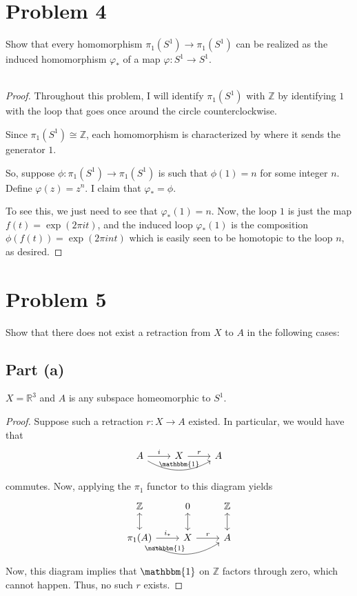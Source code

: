 \documentclass[fontsize=11pt]{scrartcl} %
\numberwithin{equation}{section} %
\numberwithin{figure}{section} %
\numberwithin{table}{section} %
\newcommand{\R}{\mathbb{R}}
\newcommand{\Z}{\mathbb{Z}}
\begin{document}
\newpage
\section*{Problem 4}
Show that every homomorphism $\pi_1(S^1)\to \pi_1(S^1)$ can be realized as the
induced homomorphism $\varphi_*$ of a map $\varphi:S^1\to S^1$.
\\
\\
\begin{proof}
    Throughout this problem, I will identify $\pi_1(S^1)$ with $\Z$ by
    identifying $1$ with the loop that goes once around the circle
    counterclockwise.

    Since $\pi_1(S^1) \cong \Z$, each homomorphism is characterized by where it
    sends the generator $1$.

    So, suppose $\phi:\pi_1(S^1)\to\pi_1(S^1)$ is such that $\phi(1) = n$ for
    some integer $n$. Define $\varphi(z) = z^n$. I claim that $\varphi_* =
    \phi$.

    To see this, we just need to see that $\varphi_*(1) = n$. Now, the loop $1$
    is just the map $f(t) = \exp(2\pi i t)$, and the induced loop $\varphi_*(1)$ is the
    composition $\phi(f(t)) = \exp(2\pi i nt)$ which is easily seen to be
    homotopic to the loop $n$, as desired.
\end{proof}

\newpage
\section*{Problem 5}
Show that there does not exist a retraction from $X$ to $A$ in the following
cases:
\subsection*{Part (a)}
$X=\R^3$ and $A$ is any subspace homeomorphic to $S^1$.
\begin{proof}
    Suppose such a retraction $r:X\to A$ existed. In particular, we would have
    that
    \[
\begin{tikzcd}
    A\arrow{r}{i}\arrow[bend right]{rr}{\mathbbm{1}} &X\arrow{r}{r} &A
\end{tikzcd}
    \]
    commutes. Now, applying the $\pi_1$ functor to this diagram yields
    \[
\begin{tikzcd}
    \Z\arrow[leftrightarrow]{d} &0\arrow[leftrightarrow]{d}
    &\Z\arrow[leftrightarrow]{d}\\
    \pi_1(A)\arrow{r}{i_*}\arrow[bend right]{rr}{\mathbbm{1}} &X\arrow{r}{r} &A
\end{tikzcd}
    \]
    Now, this diagram implies that $\mathbbm{1}$ on $\Z$ factors through zero,
    which cannot happen. Thus, no such $r$ exists.
\end{proof}
\end{document}
